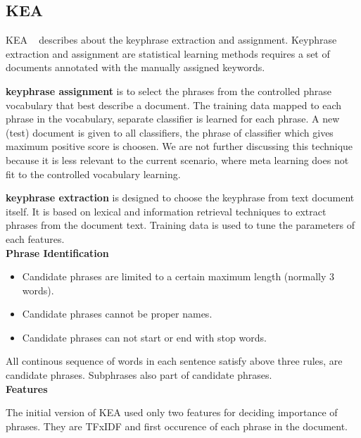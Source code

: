 

\subsection{ KEA }

KEA ~\citep{witten1999kea} describes about the keyphrase extraction and assignment. Keyphrase extraction and assignment are statistical learning methods requires a set of documents annotated with the manually assigned keywords.

\textbf{keyphrase assignment} is to select the phrases from the controlled phrase vocabulary that best describe a document. The training data mapped to each phrase in the vocabulary, separate classifier is learned for each phrase. A new (test) document is given to all classifiers, the phrase of classifier which gives maximum positive score is choosen. We are not further discussing this technique because it is less relevant to the current scenario, where meta learning does not fit to the controlled vocabulary learning.

\textbf{keyphrase extraction} is designed to choose the keyphrase from text document itself. It is based on lexical and information retrieval techniques to extract phrases from the document text. Training data is used to tune the parameters of each features.\\


\noindent \textbf{Phrase Identification}

\begin{itemize}
\item{Candidate phrases are limited to a certain maximum length (normally 3 words)}.
\item{Candidate phrases cannot be proper names}.
\item{Candidate phrases can not start or end with stop words}.
\end{itemize}
All continous sequence of words in each sentence satisfy above three rules, are candidate phrases. Subphrases also part of candidate phrases.\\

\noindent \textbf{Features}

The initial version of KEA used only two features for deciding importance of phrases. They are TFxIDF and first occurence of each phrase in the document.

